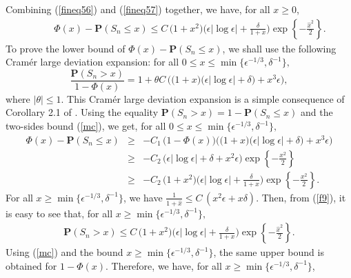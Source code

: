 \documentclass{gSTA2e}
\theoremstyle{plain}
\theoremstyle{definition}
\theoremstyle{remark}
\begin{document}
Combining (\ref{fineq56}) and (\ref{fineq57}) together, we have, for all $x \geq 0$,
\begin{eqnarray}
 \ \ \ \ \ \ \ \ \ \   \Phi\left( x \right)  -  \mathbf{P}(S_n \leq x ) \leq
    C \, \Big(1+x^2 \Big) \bigg( \epsilon |\log \epsilon |  + \frac{\delta}{1+x }  \bigg)\exp\left\{ -\frac{\widehat{x}^2 }{2} \right\}.\label{fupbounds}
\end{eqnarray}
To prove the lower bound of $ \Phi\left( x \right) - \mathbf{P}(S_n \leq x ) $, we shall use the following Cram\'{e}r large deviation expansion: for all $0\leq x \leq  \min\{\epsilon^{-1/3}, \delta^{-1}\},$
\begin{equation}
\frac{\mathbf{P}(S_n>x)}{1-\Phi \left( x\right)}= 1 + \theta C\,\bigg(  \Big(1+x \Big)\Big(\epsilon \left| \log  \epsilon
 \right| + \delta \Big)+ x^3\epsilon \bigg),
\end{equation}
where $|\theta|\leq 1$.  This Cram\'{e}r large deviation expansion is a simple consequence of Corollary 2.1 of \cite{FGL13}. Using the equality  $\mathbf{P}(S_n>x)=1- \mathbf{P}(S_n \leq x)$ and the two-sides bound (\ref{mc}), we get, for all $0\leq x \leq  \min\{\epsilon^{-1/3}, \delta^{-1}\},$
\begin{eqnarray}
 \Phi\left( x \right)-  \mathbf{P}(S_n \leq x )   &\geq& - C_1\, \Big(1-\Phi \left( x\right) \Big) \bigg(  \Big(1+x \Big)\Big(\epsilon \left| \log  \epsilon
 \right| + \delta \Big)+ x^3\epsilon \bigg)  \nonumber\\
 &\geq& - C_2\,\Big( \epsilon \left| \log  \epsilon
 \right| + \delta  + x^2\epsilon \Big) \exp\left\{ -\frac{x ^2 }{2} \right\} \nonumber\\
 &\geq& - C_2\, \Big(1+x^2 \Big)\Big( \epsilon \left| \log  \epsilon
 \right| + \frac{\delta}{1+x }   \Big) \exp\left\{ -\frac{ x  ^2 }{2} \right\}. \label{f34sd1}
\end{eqnarray}
For all $ x \geq  \min\{\epsilon^{-1/3}, \delta^{-1}\}$, we have $\frac{1}{1+ \widehat{x}} \leq C\, ( x^2 \epsilon+ x\delta).$ Then, from (\ref{f9}), it is easy to see that, for all $ x \geq  \min\{\epsilon^{-1/3}, \delta^{-1}\},$
\begin{eqnarray}
  \mathbf{P}(S_n>x )  \leq   C \,  \Big(1+x^2 \Big) \Big( \epsilon \left| \log  \epsilon
 \right| + \frac{\delta}{1+x }   \Big)\exp\left\{ -\frac{\widehat{ x }^2 }{2} \right\}. \label{f34sd2}
\end{eqnarray}
Using (\ref{mc}) and the bound $ x \geq  \min\{\epsilon^{-1/3}, \delta^{-1}\}$, the same upper bound is obtained for $1-\Phi(x)$.
Therefore, we have, for all $ x \geq  \min\{\epsilon^{-1/3}, \delta^{-1}\}$,
\end{document}
